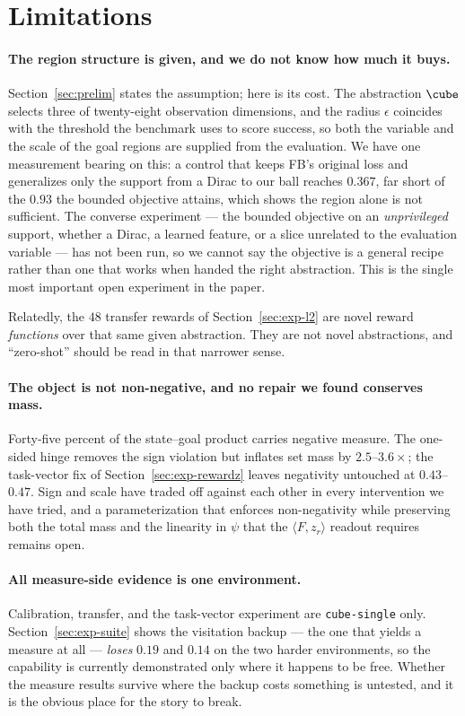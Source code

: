 \section{Limitations}
\label{sec:limitations}

\paragraph{The region structure is given, and we do not know how much it buys.}
Section~\ref{sec:prelim} states the assumption; here is its cost. The abstraction
$\cube$ selects three of twenty-eight observation dimensions, and the radius
$\epsilon$ coincides with the threshold the benchmark uses to score success, so
both the variable and the scale of the goal regions are supplied from the
evaluation. We have one measurement bearing on this: a control that keeps FB's
original loss and generalizes only the support from a Dirac to our ball reaches
$0.367$, far short of the $0.93$ the bounded objective attains, which shows the
region alone is not sufficient. The converse experiment --- the bounded objective
on an \emph{unprivileged} support, whether a Dirac, a learned feature, or a slice
unrelated to the evaluation variable --- has not been run, so we cannot say the
objective is a general recipe rather than one that works when handed the right
abstraction. This is the single most important open experiment in the paper.

Relatedly, the $48$ transfer rewards of Section~\ref{sec:exp-l2} are novel reward
\emph{functions} over that same given abstraction. They are not novel
abstractions, and ``zero-shot'' should be read in that narrower sense.

\paragraph{The object is not non-negative, and no repair we found conserves mass.}
Forty-five percent of the state--goal product carries negative measure. The
one-sided hinge removes the sign violation but inflates set mass by
$2.5$--$3.6\times$; the task-vector fix of Section~\ref{sec:exp-rewardz} leaves
negativity untouched at $0.43$--$0.47$. Sign and scale have traded off against
each other in every intervention we have tried, and a parameterization that
enforces non-negativity while preserving both the total mass and the linearity in
$\psi$ that the $\langle F,z_r\rangle$ readout requires remains open.

\paragraph{All measure-side evidence is one environment.}
Calibration, transfer, and the task-vector experiment are \texttt{cube-single}
only. Section~\ref{sec:exp-suite} shows the visitation backup --- the one that
yields a measure at all --- \emph{loses} $0.19$ and $0.14$ on the two harder
environments, so the capability is currently demonstrated only where it happens to
be free. Whether the measure results survive where the backup costs something is
untested, and it is the obvious place for the story to break.

